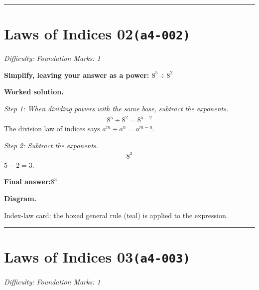 \documentclass[11pt]{article}
\newcommand{\question}[1]{\par\medskip\noindent\textbf{#1}\par}
\begin{document}
\medskip\hrule

\section*{Laws of Indices 02\quad\small\texttt{(a4-002)}}
\textit{Difficulty: Foundation \quad\textbar\quad Marks: 1}

\question{Simplify, leaving your answer as a power: \( 8^5 \div 8^2 \)}

\textbf{Worked solution.}

\textit{Step 1: When dividing powers with the same base, subtract the exponents.}
\[\begin{gathered}
8^5 \div 8^2 = 8^{5-2}
\end{gathered}\]
The division law of indices says \( a^m \div a^n = a^{m-n} \).

\textit{Step 2: Subtract the exponents.}
\[\begin{gathered}
8^{3}
\end{gathered}\]
\( 5 - 2 = 3 \).

\begin{answerbox}
\textbf{Final answer:}\quad \(\displaystyle 8^{3}\)
\end{answerbox}
\textbf{Diagram.}

\begin{center}
\end{center}
\small Index-law card: the boxed general rule (teal) is applied to the expression.\normalsize

\medskip\hrule

\section*{Laws of Indices 03\quad\small\texttt{(a4-003)}}
\textit{Difficulty: Foundation \quad\textbar\quad Marks: 1}
\end{document}
